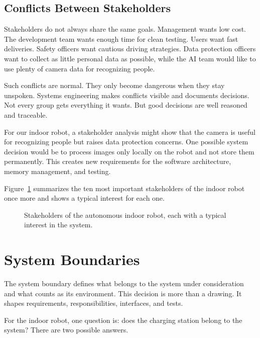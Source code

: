 \subsection{Conflicts Between Stakeholders}
Stakeholders do not always share the same goals. Management wants low cost. The development team wants enough time for clean testing. Users want fast deliveries. Safety officers want cautious driving strategies. Data protection officers want to collect as little personal data as possible, while the AI team would like to use plenty of camera data for recognizing people.

Such conflicts are normal. They only become dangerous when they stay unspoken. Systems engineering makes conflicts visible and documents decisions. Not every group gets everything it wants. But good decisions are well reasoned and traceable.

\begin{praxisbox}
For our indoor robot, a stakeholder analysis might show that the camera is useful for recognizing people but raises data protection concerns. One possible system decision would be to process images only locally on the robot and not store them permanently. This creates new requirements for the software architecture, memory management, and testing.
\end{praxisbox}

Figure~\ref{fig:kap01-stakeholder} summarizes the ten most important stakeholders of the indoor robot once more and shows a typical interest for each one.

\begin{figure}[H]
  \centering
  \caption{Stakeholders of the autonomous indoor robot, each with a typical interest in the system.}
  \label{fig:kap01-stakeholder}
\end{figure}

\section{System Boundaries}
The system boundary defines what belongs to the system under consideration and what counts as its environment. This decision is more than a drawing. It shapes requirements, responsibilities, interfaces, and tests.

For the indoor robot, one question is: does the charging station belong to the system? There are two possible answers.

